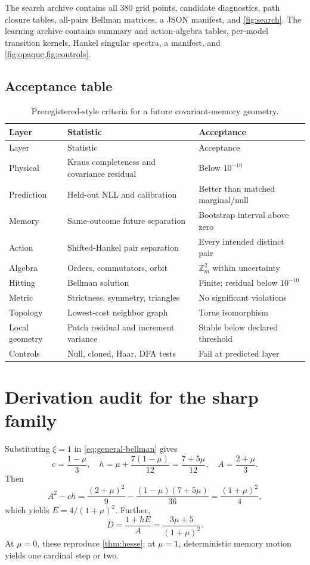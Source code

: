 \documentclass[11pt]{article}
\theoremstyle{definition}
\theoremstyle{remark}
\newcommand{\Z}{\mathbb Z}
\begin{document}
The search archive contains all \(380\) grid points, candidate diagnostics,
path closure tables, all-pairs Bellman matrices, a JSON manifest, and
\cref{fig:search}. The learning archive contains summary and action-algebra
tables, per-model transition kernels, Hankel singular spectra, a manifest, and
\cref{fig:opaque,fig:controls}.

\subsection{Acceptance table}

\begin{longtable}{p{.18\linewidth}p{.34\linewidth}p{.37\linewidth}}
\caption{Preregistered-style criteria for a future covariant-memory geometry.}
\label{tab:accept}\\
\toprule
Layer&Statistic&Acceptance\\
\midrule
\endfirsthead
\toprule
Layer&Statistic&Acceptance\\
\midrule
\endhead
Physical&Kraus completeness and covariance residual&Below \(10^{-10}\)\\
Prediction&Held-out NLL and calibration&Better than matched marginal/null\\
Memory&Same-outcome future separation&Bootstrap interval above zero\\
Action&Shifted-Hankel pair separation&Every intended distinct pair\\
Algebra&Orders, commutators, orbit&\(\Z_m^2\) within uncertainty\\
Hitting&Bellman solution&Finite; residual below \(10^{-10}\)\\
Metric&Strictness, symmetry, triangles&No significant violations\\
Topology&Lowest-cost neighbor graph&Torus isomorphism\\
Local geometry&Patch residual and increment variance&Stable below declared threshold\\
Controls&Null, cloned, Haar, DFA tests&Fail at predicted layer\\
\bottomrule
\end{longtable}

\section{Derivation audit for the sharp family}

Substituting \(\xi=1\) in \cref{eq:general-bellman} gives
\[
c=\frac{1-\mu}{3},\quad
h=\mu+\frac{7(1-\mu)}{12}=\frac{7+5\mu}{12},\quad
A=\frac{2+\mu}{3}.
\]
Then
\[
A^2-ch
=\frac{(2+\mu)^2}{9}
-\frac{(1-\mu)(7+5\mu)}{36}
=\frac{(1+\mu)^2}{4},
\]
which yields \(E=4/(1+\mu)^2\). Further,
\[
D=\frac{1+hE}{A}
=\frac{3\mu+5}{(1+\mu)^2}.
\]
At \(\mu=0\), these reproduce \cref{thm:hesse}; at \(\mu=1\), deterministic
memory motion yields one cardinal step or two.
\end{document}
